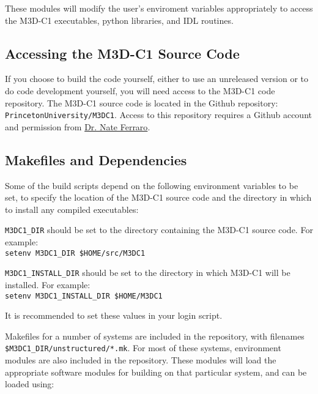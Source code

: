 These modules will modify the user's enviroment variables
appropriately to access the M3D-C1 executables, python libraries, and
IDL routines.



\subsection{Accessing the M3D-C1 Source Code}

If you choose to build the code yourself, either to use an unreleased
version or to do code development yourself, you will need access to
the M3D-C1 code repository.  The M3D-C1 source code is located in the
Github repository: \texttt{PrincetonUniversity/M3DC1}. Access to this
repository requires a Github account and permission from
\href{mailto:nferraro@pppl.gov}{Dr. Nate Ferraro}.


\subsection{Makefiles and Dependencies}

Some of the build scripts depend on the following environment
variables to be set, to specify the location of the M3D-C1 source code
and the directory in which to install any compiled executables:
\begin{description}
\item{\texttt{M3DC1\_DIR}} should be set to the directory containing
  the M3D-C1 source code.  For example:\\
  \texttt{setenv M3DC1\_DIR \$HOME/src/M3DC1}
\item{\texttt{M3DC1\_INSTALL\_DIR}} should be set to the directory in
  which M3D-C1 will be installed.  For example:\\
  \texttt{setenv M3DC1\_INSTALL\_DIR \$HOME/M3DC1}
\end{description}
It is recommended to set these values in your login script.

Makefiles for a number of systems are included in the repository,
with filenames \texttt{\$M3DC1\_DIR/unstructured/*.mk}.  For most of
these systems, environment modules are also included in the
repository.  These modules will load the appropriate software modules
for building on that particular system, and can be loaded using:

